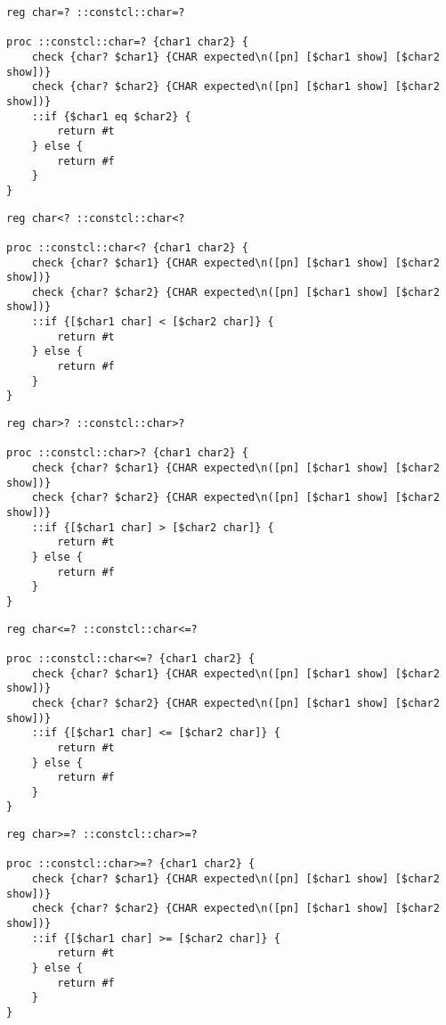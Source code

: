 \documentclass{report}
\begin{document}
\noindent\makebox[\linewidth]{\rule{\linewidth}{0.4pt}}
\begin{lstlisting}
reg char=? ::constcl::char=?
 
proc ::constcl::char=? {char1 char2} {
    check {char? $char1} {CHAR expected\n([pn] [$char1 show] [$char2 show])}
    check {char? $char2} {CHAR expected\n([pn] [$char1 show] [$char2 show])}
    ::if {$char1 eq $char2} {
        return #t
    } else {
        return #f
    }
}
\end{lstlisting}
\noindent\makebox[\linewidth]{\rule{\linewidth}{0.4pt}}
\noindent\makebox[\linewidth]{\rule{\linewidth}{0.4pt}}
\begin{lstlisting}
reg char<? ::constcl::char<?
 
proc ::constcl::char<? {char1 char2} {
    check {char? $char1} {CHAR expected\n([pn] [$char1 show] [$char2 show])}
    check {char? $char2} {CHAR expected\n([pn] [$char1 show] [$char2 show])}
    ::if {[$char1 char] < [$char2 char]} {
        return #t
    } else {
        return #f
    }
}
\end{lstlisting}
\noindent\makebox[\linewidth]{\rule{\linewidth}{0.4pt}}
\noindent\makebox[\linewidth]{\rule{\linewidth}{0.4pt}}
\begin{lstlisting}
reg char>? ::constcl::char>?
 
proc ::constcl::char>? {char1 char2} {
    check {char? $char1} {CHAR expected\n([pn] [$char1 show] [$char2 show])}
    check {char? $char2} {CHAR expected\n([pn] [$char1 show] [$char2 show])}
    ::if {[$char1 char] > [$char2 char]} {
        return #t
    } else {
        return #f
    }
}
\end{lstlisting}
\noindent\makebox[\linewidth]{\rule{\linewidth}{0.4pt}}
\noindent\makebox[\linewidth]{\rule{\linewidth}{0.4pt}}
\begin{lstlisting}
reg char<=? ::constcl::char<=?
 
proc ::constcl::char<=? {char1 char2} {
    check {char? $char1} {CHAR expected\n([pn] [$char1 show] [$char2 show])}
    check {char? $char2} {CHAR expected\n([pn] [$char1 show] [$char2 show])}
    ::if {[$char1 char] <= [$char2 char]} {
        return #t
    } else {
        return #f
    }
}
\end{lstlisting}
\noindent\makebox[\linewidth]{\rule{\linewidth}{0.4pt}}
\noindent\makebox[\linewidth]{\rule{\linewidth}{0.4pt}}
\begin{lstlisting}
reg char>=? ::constcl::char>=?
 
proc ::constcl::char>=? {char1 char2} {
    check {char? $char1} {CHAR expected\n([pn] [$char1 show] [$char2 show])}
    check {char? $char2} {CHAR expected\n([pn] [$char1 show] [$char2 show])}
    ::if {[$char1 char] >= [$char2 char]} {
        return #t
    } else {
        return #f
    }
}
\end{lstlisting}
\noindent\makebox[\linewidth]{\rule{\linewidth}{0.4pt}}
\end{document}
